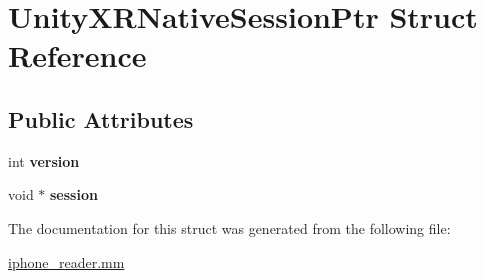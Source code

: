 \hypertarget{structUnityXRNativeSessionPtr}{}\section{Unity\+X\+R\+Native\+Session\+Ptr Struct Reference}
\label{structUnityXRNativeSessionPtr}
\subsection*{Public Attributes}
\begin{DoxyCompactItemize}
\item 
\mbox{\label{structUnityXRNativeSessionPtr_af9cb08b7c1666c1692eea15ee16cb636}} 
int {\bfseries version}
\item 
\mbox{\label{structUnityXRNativeSessionPtr_a10991ea6b0b08a1ad91fe2fffb5de308}} 
void $\ast$ {\bfseries session}
\end{DoxyCompactItemize}


The documentation for this struct was generated from the following file\+:\begin{DoxyCompactItemize}
\item 
\hyperlink{iphone__reader_8mm}{iphone\+\_\+reader.\+mm}\end{DoxyCompactItemize}
